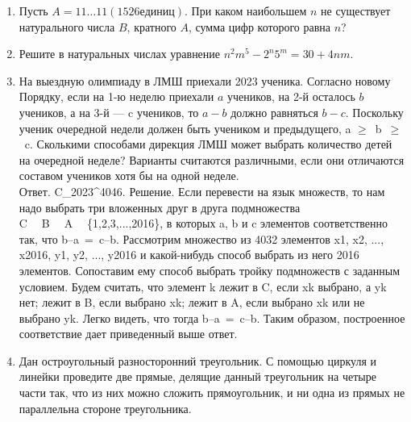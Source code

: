 \documentclass{article}
\begin{document}
\begin{enumerate}
		\item Пусть $A = 11 \dots 11 (1526 единиц)$. При каком наибольшем $n$ не существует натурального числа $B$, кратного $A$, сумма цифр которого равна $n$?
		\item Решите в натуральных числах уравнение $n^2m^5-2^n5^m = 30+4nm.$
		\item На выездную олимпиаду в ЛМШ приехали 2023 ученика. Согласно новому Порядку, если на 1-ю неделю приехали $a$ учеников, на 2-й осталось $b$ учеников, а на 3-й --- c учеников, то $a-b$ должно равняться $b-c$. Поскольку ученик очередной недели должен быть учеником и предыдущего, a $\ge$ b $\ge$ c. Сколькими способами дирекция ЛМШ может выбрать количество детей на очередной неделе? Варианты считаются различными, если они отличаются составом учеников хотя бы на одной неделе.\\
		Ответ. C_{2023}^{4046}. Решение. Если перевести на язык множеств, то нам надо выбрать три вложенных друг в друга подмножества C  B  A  \{1,2,3,...,2016\}, в которых a, b и c элементов соответственно так, что b–a = c–b. Рассмотрим множество из 4032 элементов x1, x2, ..., x2016, y1, y2, ..., y2016 и какой-нибудь способ выбрать из него 2016 элементов. Сопоставим ему способ выбрать тройку подмножеств с заданным условием. Будем считать, что элемент k лежит в C, если xk выбрано, а yk нет; лежит в B, если выбрано xk; лежит в A, если выбрано xk или не выбрано yk. Легко видеть, что тогда b–a = c–b. Таким образом, построенное соответствие дает приведенный выше ответ.
		\item Дан остроугольный разносторонний треугольник. С помощью циркуля и линейки проведите две прямые, делящие данный треугольник на четыре части так, что из них можно сложить прямоугольник, и ни одна из прямых не параллельна стороне треугольника.
	\end{enumerate}
\end{document}
